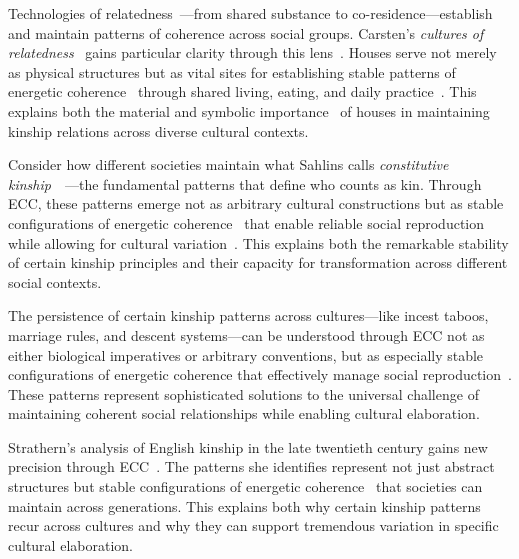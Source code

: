 Technologies of relatedness~—from shared substance to co-residence—establish and maintain patterns of coherence across social groups. Carsten's \textit{cultures of relatedness}~ gains particular clarity through this lens~\cite{carsten2000cultures}. Houses serve not merely as physical structures but as vital sites for establishing stable patterns of energetic coherence~ through shared living, eating, and daily practice~\cite{miller2005materiality,ingold2013making}. This explains both the material and symbolic importance~ of houses in maintaining kinship relations across diverse cultural contexts.

Consider how different societies maintain what Sahlins calls \textit{constitutive kinship}~~\cite{sahlins2013what}—the fundamental patterns that define who counts as kin. Through ECC, these patterns emerge not as arbitrary cultural constructions but as stable configurations of energetic coherence~ that enable reliable social reproduction while allowing for cultural variation~\cite{shore1996culture}. This explains both the remarkable stability of certain kinship principles and their capacity for transformation across different social contexts.

The persistence of certain kinship patterns across cultures—like incest taboos, marriage rules, and descent systems—can be understood through ECC not as either biological imperatives or arbitrary conventions, but as especially stable configurations of energetic coherence that effectively manage social reproduction~\cite{godelier2011metamorphoses,bloch2012anthropology}. These patterns represent sophisticated solutions to the universal challenge of maintaining coherent social relationships while enabling cultural elaboration.

Strathern's analysis of English kinship in the late twentieth century gains new precision through ECC~\cite{strathern1992after}. The patterns she identifies represent not just abstract structures but stable configurations of energetic coherence~ that societies can maintain across generations. This explains both why certain kinship patterns recur across cultures and why they can support tremendous variation in specific cultural elaboration.


